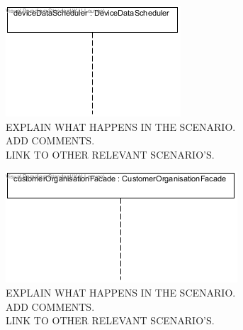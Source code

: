     \begin{figure}[!htp]
    	\centering
    	\includegraphics[width=\textwidth]{images/sequence-UC11}
    	\caption[Sensor data being processed by the system]{EXPLAIN WHAT HAPPENS IN THE SCENARIO. \\ ADD COMMENTS. \\ LINK TO OTHER RELEVANT SCENARIO'S. }\label{fig:seq_scenario1}
    \end{figure}

    \begin{figure}[!htp]
    	\centering
    	\includegraphics[width=\textwidth]{images/sequence-UC19}
    	\caption[ Subscribing to an application]{EXPLAIN WHAT HAPPENS IN THE SCENARIO. \\ ADD COMMENTS. \\ LINK TO OTHER RELEVANT SCENARIO'S. }\label{fig:seq_scenario2}
    \end{figure}

